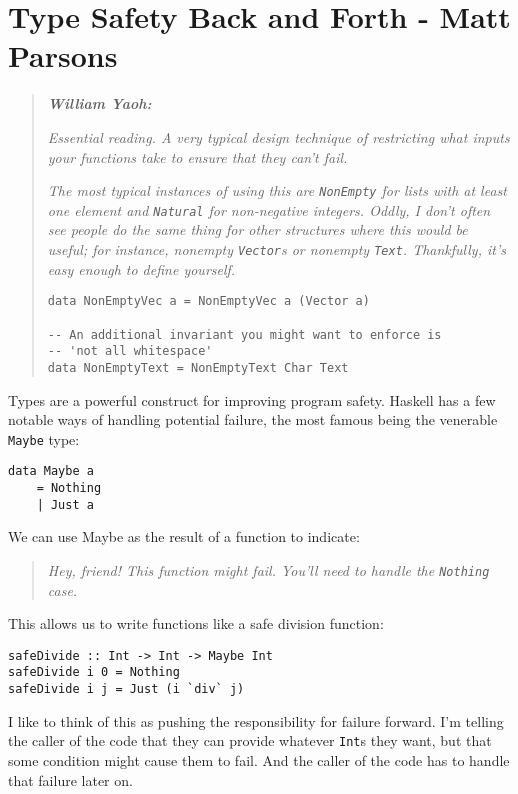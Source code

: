 \section{Type Safety Back and Forth - Matt Parsons}
\label{sec:type_safety_back_and_forth}

\begin{quotation}
\noindent\textit{\textbf{William Yaoh:}}

\textit{Essential reading. A very typical design technique of restricting what inputs your functions take to ensure that they can't fail.}

\textit{The most typical instances of using this are \texttt{NonEmpty} for lists with at least one element and \texttt{Natural} for non-negative integers. Oddly, I don't often see people do the same thing for other structures where this would be useful; for instance, nonempty \texttt{Vector}s or nonempty \texttt{Text}. Thankfully, it's easy enough to define yourself.}
\begin{verbatim}
data NonEmptyVec a = NonEmptyVec a (Vector a)

-- An additional invariant you might want to enforce is
-- 'not all whitespace'
data NonEmptyText = NonEmptyText Char Text
\end{verbatim}
\end{quotation}


Types are a powerful construct for improving program safety. Haskell has a few notable ways of handling potential failure, the most famous being the venerable \texttt{Maybe} type:

\begin{verbatim}
data Maybe a
    = Nothing
    | Just a
\end{verbatim}
We can use Maybe as the result of a function to indicate:
\begin{quotation}
\noindent \textit{Hey, friend! This function might fail. You'll need to handle the \texttt{Nothing} case.                                                                             } 
\end{quotation} 
This allows us to write functions like a safe division function:

\begin{verbatim}
safeDivide :: Int -> Int -> Maybe Int
safeDivide i 0 = Nothing
safeDivide i j = Just (i `div` j)
\end{verbatim}

I like to think of this as pushing the responsibility for failure forward. I'm telling the caller of the code that they can provide whatever \texttt{Int}s they want, but that some condition might cause them to fail. And the caller of the code has to handle that failure later on.

